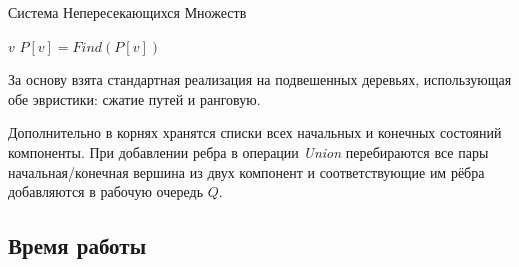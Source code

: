 \begin{algorithm}[h]
  \begin{algorithmic}[1]
  \caption{Система Непересекающихся Множеств}
  \label{algo:DSU}
          \EndFor
          \EndFor
          \EndFor
      \EndFunction
              \Return $v$
          \EndIf
          \Return $P[v] = Find(P[v])$
      \EndFunction
              \Return
          \EndIf
          \EndIf
      \EndFunction
  \EndStructure
  \end{algorithmic}
\end{algorithm}

За основу взята стандартная реализация \cite{Hopcroft1973} на подвешенных деревьях, использующая обе эвристики: сжатие путей и ранговую. 

Дополнительно в корнях хранятся списки всех начальных и конечных состояний компоненты. При добавлении ребра в операции \textit{Union} перебираются все пары начальная/конечная вершина из двух компонент и соответствующие им рёбра добавляются в рабочую очередь $Q$. 


\subsection*{Время работы}

